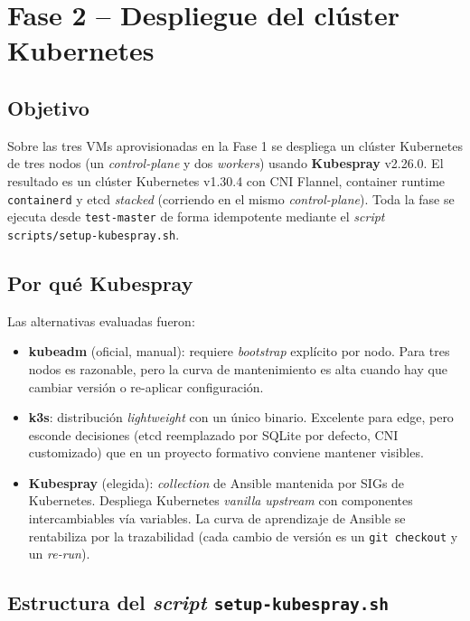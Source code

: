 \section{Fase 2 -- Despliegue del clúster Kubernetes}

\subsection{Objetivo}

Sobre las tres VMs aprovisionadas en la Fase 1 se despliega un clúster Kubernetes de tres nodos (un \emph{control-plane} y dos \emph{workers}) usando \textbf{Kubespray} v2.26.0. El resultado es un clúster Kubernetes v1.30.4 con CNI Flannel, container runtime \texttt{containerd} y etcd \emph{stacked} (corriendo en el mismo \emph{control-plane}). Toda la fase se ejecuta desde \texttt{test-master} de forma idempotente mediante el \emph{script} \texttt{scripts/setup-kubespray.sh}.

\subsection{Por qué Kubespray}

Las alternativas evaluadas fueron:

\begin{itemize}
  \item \textbf{kubeadm} (oficial, manual): requiere \emph{bootstrap} explícito por nodo. Para tres nodos es razonable, pero la curva de mantenimiento es alta cuando hay que cambiar versión o re-aplicar configuración.
  \item \textbf{k3s}: distribución \emph{lightweight} con un único binario. Excelente para edge, pero esconde decisiones (etcd reemplazado por SQLite por defecto, CNI customizado) que en un proyecto formativo conviene mantener visibles.
  \item \textbf{Kubespray} (elegida): \emph{collection} de Ansible mantenida por SIGs de Kubernetes. Despliega Kubernetes \emph{vanilla} \emph{upstream} con componentes intercambiables vía variables. La curva de aprendizaje de Ansible se rentabiliza por la trazabilidad (cada cambio de versión es un \texttt{git checkout} y un \emph{re-run}).
\end{itemize}

\subsection{Estructura del \emph{script} \texttt{setup-kubespray.sh}}

